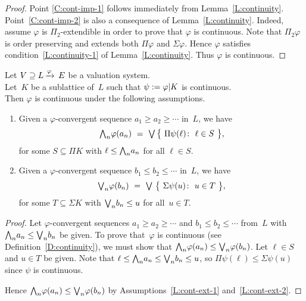 \documentclass[main.tex]{subfiles}
\begin{document}
\begin{proof}
Point \ref{C:cont-imp-1}
follows immediately from Lemma~\ref{L:continuity}.
Point~\ref{C:cont-imp-2} is also
a consequence of Lemma~\ref{L:continuity}.
Indeed, 
assume $\varphi$ is $\Pi_2$-extendible
in order to prove that $\varphi$ is continuous.
Note that $\Pi_2 \varphi$
is order preserving and
extends both $\Pi\varphi$ and $\Sigma\varphi$.
Hence $\varphi$ satisfies condition~\ref{L:continuity-1}
of Lemma~\ref{L:continuity}.
Thus $\varphi$ is continuous.
\end{proof}
%
%
\begin{lem}
\label{L:cont-ext}
Let $V \supseteq L\,\smash{\xrightarrow{\varphi}\,E}$
be a valuation system.\\
Let~$K$ be a sublattice of~$L$
such that $\psi := \varphi | K$
is continuous.\\
Then $\varphi$ is continuous
under the following assumptions.
\begin{enumerate}
\item\label{L:cont-ext-1}
Given a $\varphi$-convergent sequence $a_1 \geq a_2 \geq \dotsb$ 
in~$L$, we have
\begin{equation*}
\bw_n \varphi(a_n) \ = \ 
\bv\,\bigl\{\ \Pi \psi(\ell) \colon\ 
 \ell \in S \ \bigr\},
\end{equation*}
for some $S\subseteq \Pi K$
with $\ell \leq \textstyle{\bigwedge}_n a_n$ for all $\ell \in S$.

\item\label{L:cont-ext-2}
Given a 
$\varphi$-convergent sequence 
$b_1 \leq b_2 \leq \dotsb$ in~$L$,
we have
\begin{equation*}
\textstyle{\bigvee}_n \varphi(b_n) \ = 
\ \textstyle{\bigvee} \ \bigl\{ \ \Sigma\psi(u) \colon \ u \in T\ \bigr\},
\end{equation*}
for some $T\subseteq \Sigma K$ with $\textstyle{\bigvee}_n b_n \leq u$
for all~$u\in T$.
\end{enumerate}
\end{lem}
\begin{proof}
Let $\varphi$-convergent sequences $a_1 \geq a_2 \geq \dotsb$
and $b_1 \leq b_2 \leq \dotsb$ from~$L$ 
with $\textstyle{\bigwedge}_n a_n \leq \textstyle{\bigvee}_n b_n$ be given.
To prove that~$\varphi$
is continuous
(see Definition~\ref{D:continuity}),
we must show that $\textstyle{\bigwedge}_n \varphi(a_n) \leq \textstyle{\bigvee}_n \varphi(b_n)$.
Let $\ell\in S$ and $u\in T$
be given.
Note that 
$\ell \leq \textstyle{\bigwedge}_n a_n \leq \textstyle{\bigvee}_n b_n \leq u$,
so
$\Pi\psi(\ell) \leq \Sigma\psi (u)$
since $\psi$ is continuous.

Hence $\textstyle{\bigwedge}_n \varphi(a_n) \leq \textstyle{\bigvee}_n \varphi(b_n)$
by Assumptions~\ref{L:cont-ext-1}
and~\ref{L:cont-ext-2}.
\end{proof}
%
%
\end{document}
